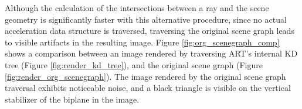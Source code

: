 Although the calculation of the intersections between a ray and the scene geometry is significantly faster with this alternative procedure, since no actual acceleration data structure is traversed, traversing the original scene graph leads to visible artifacts in the resulting image. Figure \ref{fig:org_scenegraph_comp} shows a comparison between an image rendered by traversing ART's internal KD tree (Figure \ref{fig:render_kd_tree}), and the original scene graph (Figure \ref{fig:render_org_scenegraph}). The image rendered by the original scene graph traversal exhibits noticeable noise, and a black triangle is visible on the vertical stabilizer of the biplane in the image.


